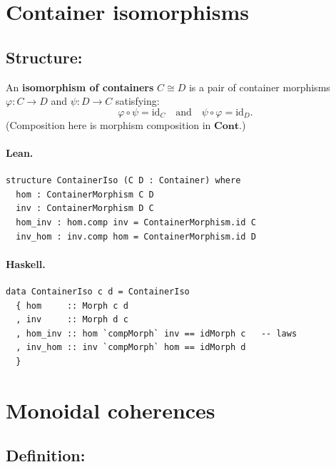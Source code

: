 \documentclass[11pt,a4paper]{article}
\begin{document}
\section{Container isomorphisms}

\subsection{Structure: }

\begin{defn}
An \textbf{isomorphism of containers} $C \cong D$ is a pair of container
morphisms $\varphi : C \to D$ and $\psi : D \to C$ satisfying:
\[
  \varphi \circ \psi = \mathrm{id}_C \quad\text{and}\quad
  \psi \circ \varphi = \mathrm{id}_D.
\]
(Composition here is morphism composition in $\mathbf{Cont}$.)
\end{defn}

\paragraph{Lean.}
\begin{lstlisting}[style=lean]
structure ContainerIso (C D : Container) where
  hom : ContainerMorphism C D
  inv : ContainerMorphism D C
  hom_inv : hom.comp inv = ContainerMorphism.id C
  inv_hom : inv.comp hom = ContainerMorphism.id D
\end{lstlisting}

\paragraph{Haskell.}
\begin{lstlisting}[style=haskell]
data ContainerIso c d = ContainerIso
  { hom     :: Morph c d
  , inv     :: Morph d c
  , hom_inv :: hom `compMorph` inv == idMorph c   -- laws
  , inv_hom :: inv `compMorph` hom == idMorph d
  }
\end{lstlisting}

\section{Monoidal coherences}

\subsection{Definition: }
\end{document}

